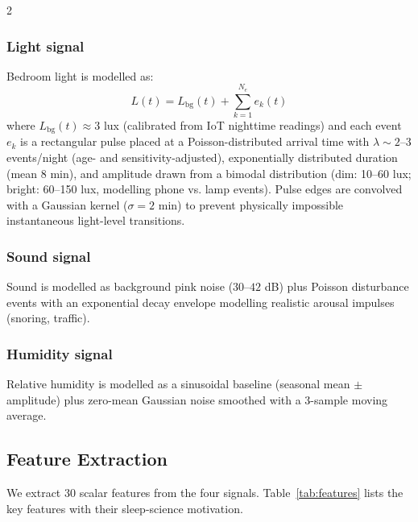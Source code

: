 \documentclass[11pt,a4paper]{article}
\begin{document}
\begin{multicols}{2}
\subsubsection{Light signal}

Bedroom light is modelled as:
\begin{equation}
  L(t) = L_{\text{bg}}(t) + \sum_{k=1}^{N_e} e_k(t)
\end{equation}
where $L_{\text{bg}}(t) \approx 3$ lux (calibrated from IoT nighttime readings)
and each event $e_k$ is a rectangular pulse placed at a Poisson-distributed
arrival time with $\lambda \sim 2$–$3$ events/night (age- and
sensitivity-adjusted), exponentially distributed duration (mean 8 min), and
amplitude drawn from a bimodal distribution (dim: 10–60 lux; bright: 60–150 lux,
modelling phone vs. lamp events).  Pulse edges are convolved with a Gaussian
kernel ($\sigma = 2$ min) to prevent physically impossible instantaneous
light-level transitions.

\subsubsection{Sound signal}

Sound is modelled as background pink noise ($30$–$42$ dB) plus Poisson
disturbance events with an exponential decay envelope modelling realistic
arousal impulses (snoring, traffic).

\subsubsection{Humidity signal}

Relative humidity is modelled as a sinusoidal baseline (seasonal mean $\pm$
amplitude) plus zero-mean Gaussian noise smoothed with a 3-sample moving average.

\subsection{Feature Extraction}
\label{sec:features}

We extract 30 scalar features from the four signals.  Table~\ref{tab:features}
lists the key features with their sleep-science motivation.


\end{multicols}
\end{document}
